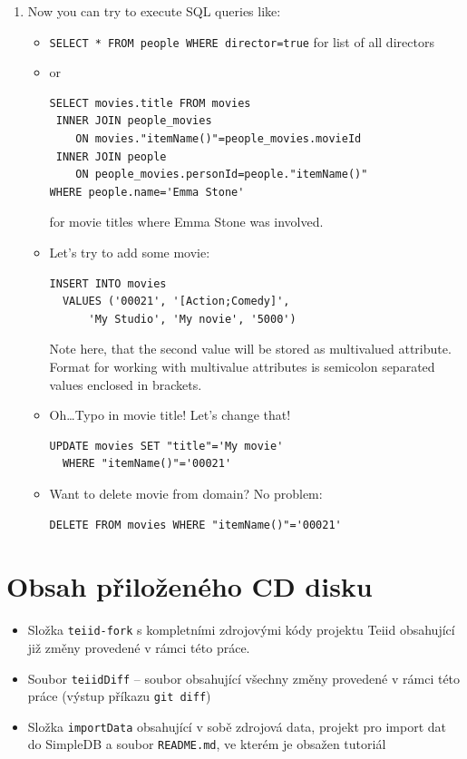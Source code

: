 \documentclass[oneside,12pt]{fithesis2}
\begin{document}
\begin{enumerate}
\begin{enumerate}
\item Now you can try to execute SQL queries like:
\begin{itemize}
 \item \texttt{SELECT * FROM people WHERE director=true} for list of all directors
 \item or
 \begin{Verbatim}[fontsize=\small]
SELECT movies.title FROM movies 
 INNER JOIN people_movies 
    ON movies."itemName()"=people_movies.movieId 
 INNER JOIN people 
    ON people_movies.personId=people."itemName()" 
WHERE people.name='Emma Stone'
 \end{Verbatim}
for movie titles where Emma Stone was involved.
\item Let's try to add some movie:
 \begin{Verbatim}[fontsize=\small]
INSERT INTO movies 
  VALUES ('00021', '[Action;Comedy]', 
	  'My Studio', 'My novie', '5000')
 \end{Verbatim}
 Note here, that the second value will be stored as multivalued attribute. Format for working with multivalue attributes is semicolon separated values enclosed in brackets.
 \item Oh\dots Typo in movie title! Let's change that!
  \begin{Verbatim}[fontsize=\small]
UPDATE movies SET "title"='My movie' 
  WHERE "itemName()"='00021'
 \end{Verbatim}
 \item Want to delete movie from domain? No problem:
   \begin{Verbatim}[fontsize=\small]
DELETE FROM movies WHERE "itemName()"='00021'
 \end{Verbatim}
\end{itemize}


\end{enumerate}


\end{enumerate}

\chapter{Obsah přiloženého CD disku}
\begin{itemize}
 \item Složka \texttt{teiid-fork} s kompletními zdrojovými kódy projektu Teiid obsahující již změny provedené v rámci této práce.
 \item Soubor \texttt{teiidDiff} -- soubor obsahující všechny změny provedené v rámci této práce (výstup příkazu \texttt{git diff})
 \item Složka \texttt{importData} obsahující v sobě zdrojová data, projekt pro import dat do SimpleDB a soubor \texttt{README.md}, ve kterém je obsažen tutoriál
\end{itemize}
\end{document}
